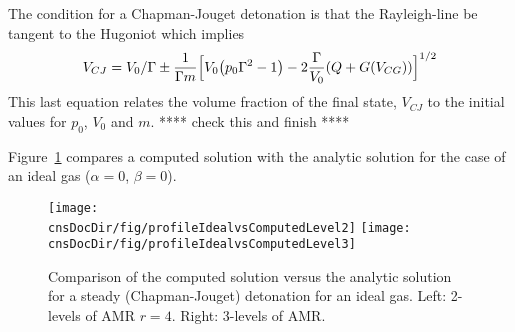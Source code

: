 \documentclass{article}
\newcommand{\obDir}{\homeHenshaw/res/OverBlown}
\newcommand{\cnsDocDir}{\homeHenshaw/cgDoc/cns}
\begin{document}

The condition for a Chapman-Jouget detonation is that the Rayleigh-line be tangent to the Hugoniot
which implies
\[
   V_{CJ} = V_0/\Gamma \pm 
    {1\over \Gamma m} \Big[ V_0\big( p_0 \Gamma^2 -1\big) -2 {\Gamma\over V_0} ( Q+G(V_{CG})) \Big]^{1/2}
\] 
This last equation relates the volume fraction of the final state, $V_{CJ}$ to the initial values
for $p_0$, $V_0$ and $m$. **** check this and finish ****

Figure~\ref{fig:detonationCJIdealComparison} compares a computed solution with the analytic solution
for the case of an ideal gas ($\alpha=0$, $\beta=0$).
\begin{figure}[hbt]
\begin{center}
  \texttt{[image: \\cnsDocDir/fig/profileIdealvsComputedLevel2]}
  \texttt{[image: \\cnsDocDir/fig/profileIdealvsComputedLevel3]}
 \end{center}
\caption{Comparison of the computed solution versus the analytic solution for a steady (Chapman-Jouget) detonation for an ideal gas. Left: 2-levels of AMR $r=4$. Right: 3-levels of AMR. } \label{fig:detonationCJIdealComparison}
\end{figure}




\end{document}
